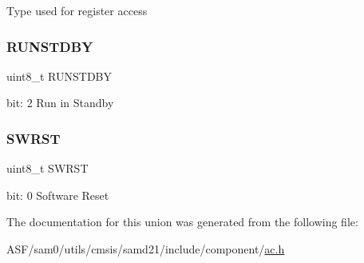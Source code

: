 Type used for register access \mbox{\label{union_a_c___c_t_r_l_a___type_aa24338c5cacc63e3b77adf2dc0938ff6}} 
\subsubsection{\texorpdfstring{RUNSTDBY}{RUNSTDBY}}
{\footnotesize\ttfamily uint8\+\_\+t R\+U\+N\+S\+T\+D\+BY}

bit\+: 2 Run in Standby \mbox{\label{union_a_c___c_t_r_l_a___type_a9334d5ac0548802c90a8129c52c8e490}} 
\subsubsection{\texorpdfstring{SWRST}{SWRST}}
{\footnotesize\ttfamily uint8\+\_\+t S\+W\+R\+ST}

bit\+: 0 Software Reset 

The documentation for this union was generated from the following file\+:\begin{DoxyCompactItemize}
\item 
A\+S\+F/sam0/utils/cmsis/samd21/include/component/\mbox{\hyperlink{component_2ac_8h}{ac.\+h}}\end{DoxyCompactItemize}

